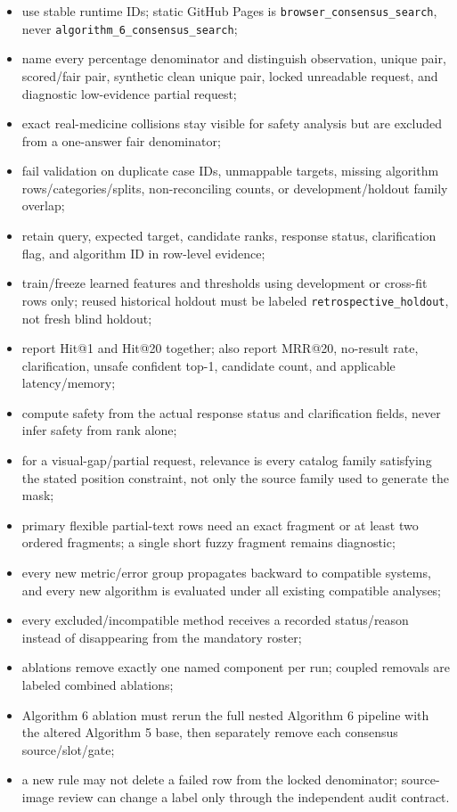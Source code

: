 \begin{itemize}
\tightlist
\item
  use stable runtime IDs; static GitHub Pages is \texttt{browser\_\allowbreak{}consensus\_\allowbreak{}search}, never \texttt{algorithm\_\allowbreak{}6\_\allowbreak{}consensus\_\allowbreak{}search};
\item
  name every percentage denominator and distinguish observation, unique pair, scored/fair pair, synthetic clean unique pair, locked unreadable request, and diagnostic low-evidence partial request;
\item
  exact real-medicine collisions stay visible for safety analysis but are excluded from a one-answer fair denominator;
\item
  fail validation on duplicate case IDs, unmappable targets, missing algorithm rows/categories/splits, non-reconciling counts, or development/holdout family overlap;
\item
  retain query, expected target, candidate ranks, response status, clarification flag, and algorithm ID in row-level evidence;
\item
  train/freeze learned features and thresholds using development or cross-fit rows only; reused historical holdout must be labeled \texttt{retrospective\_\allowbreak{}holdout}, not fresh blind holdout;
\item
  report Hit@1 and Hit@20 together; also report MRR@20, no-result rate, clarification, unsafe confident top-1, candidate count, and applicable latency/memory;
\item
  compute safety from the actual response status and clarification fields, never infer safety from rank alone;
\item
  for a visual-gap/partial request, relevance is every catalog family satisfying the stated position constraint, not only the source family used to generate the mask;
\item
  primary flexible partial-text rows need an exact fragment or at least two ordered fragments; a single short fuzzy fragment remains diagnostic;
\item
  every new metric/error group propagates backward to compatible systems, and every new algorithm is evaluated under all existing compatible analyses;
\item
  every excluded/incompatible method receives a recorded status/reason instead of disappearing from the mandatory roster;
\item
  ablations remove exactly one named component per run; coupled removals are labeled combined ablations;
\item
  Algorithm 6 ablation must rerun the full nested Algorithm 6 pipeline with the altered Algorithm 5 base, then separately remove each consensus source/slot/gate;
\item
  a new rule may not delete a failed row from the locked denominator; source-image review can change a label only through the independent audit contract.
\end{itemize}

